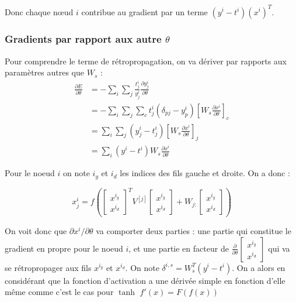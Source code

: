 \documentclass[conference]{IEEEtran}
\begin{document}
Donc chaque nœud $i$ contribue au gradient par un terme $(y^i-t^i)(x^i)^T$.

\subsubsection{Gradients par rapport aux autre $\theta$}
Pour comprendre le terme de rétropropagation, on va dériver par rapports aux paramètres autres que $W_s$ :
\begin{align*}
\frac{\partial E}{\partial \theta} &= -\sum_i\sum_j \frac{t_j^i}{y_j^i} \frac{\partial y_j^i}{\partial \theta}\\
&=-\sum_i\sum_j \sum_c t_j^i(\delta_{pj}-y_p^i)\left[W_s\frac{\partial{x^i}}{\partial\theta}\right]_c\\
&= \sum_i\sum_j (y_j^i -t_j^i)\left[W_s\frac{\partial{x^i}}{\partial\theta}\right]_j\\
&=\sum_i (y^i-t^i)W_s\frac{\partial{x^i}}{\partial\theta}
\end{align*}

Pour le noeud $i$ on note $i_g$ et $i_d$ les indices des fils gauche et droite. On a donc :

$$x^i_j=f\left( \begin{bmatrix} x^{i_g} \\ x^{i_d} \end{bmatrix}^T V^{[j]}\begin{bmatrix} x^{i_g} \\ x^{i_d} \end{bmatrix} + W_{j:}\begin{bmatrix} x^{i_g} \\ x^{i_d} \end{bmatrix}\right)$$

On voit donc que $\partial x^i / \partial \theta$ va comporter deux parties : une partie qui constitue le gradient en propre pour le noeud $i$, et une partie en facteur de $\frac{\partial}{\partial\theta}\begin{bmatrix} x^{i_g} \\ x^{i_d} \end{bmatrix}$ qui va se rétropropager aux fils $x^{i_g}$ et $x^{i_d}$.
On note $\delta^{i,s}=W_s^T(y^i-t^i)$. On a alors en considérant que la fonction d'activation a une dérivée simple en fonction d'elle même comme c'est le cas pour $\tanh$ $f'(x)=F(f(x))$
\end{document}
